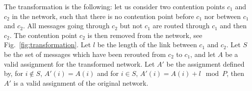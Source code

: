 \documentclass[a4paper,UKenglish,cleveref, autoref, thm-restate]{lipics-v2019}
\begin{document}
The transformation is the following: let us consider two contention points $c_1$ and $c_2$ in the network, such that there is no contention point before $c_1$ nor between $c_1$ and $c_2$. All messages going through $c_2$ but not $c_1$ are routed through $c_1$ and then $c_2$. The contention point $c_2$ is then removed from the network, see Fig.~\ref{fig:transformation}. Let $l$ be the length of the link between $c_1$ and $c_2$. Let $S$ be the set of messages which have been rerouted from $c_2$ to $c_1$, and let $A$ be a valid assignment for the transformed network. Let $A'$ be the assignment defined by, for $i\notin S$, $A'(i) = A(i)$ and for $i \in S$, $A'(i) = A(i) + l \mod P$, then $A'$ is a valid assignment of the original network.

\begin{figure}
\begin{center}

\begin{minipage}[c]{.45\linewidth}
\end{minipage}
\end{center}
\end{figure}
\end{document}
